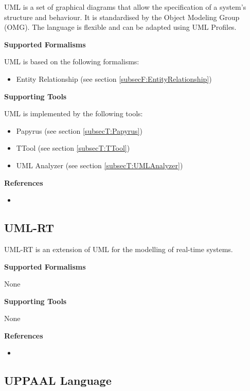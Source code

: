 UML is a set of graphical diagrams that allow the specification of a system's structure and behaviour. It is standardised by the Object Modeling Group (OMG). The language is flexible and can be adapted using UML Profiles.

\textbf{Supported Formalisms}

UML is based on the following formalisms:
\begin{itemize}
	\item Entity Relationship (see section \ref{subsecF:EntityRelationship})
\end{itemize}


\textbf{Supporting Tools}

UML is implemented by the following tools:
\begin{itemize}
	\item Papyrus (see section \ref{subsecT:Papyrus})
	\item TTool (see section \ref{subsecT:TTool})
	\item UML Analyzer (see section \ref{subsecT:UMLAnalyzer})
\end{itemize}


\textbf{References}
\begin{itemize}
	
\item {}
\end{itemize}



\subsection{UML-RT}
\label{subsecL:UML-RT}


UML-RT is an extension of UML for the modelling of real-time systems.

\textbf{Supported Formalisms}

None


\textbf{Supporting Tools}

None


\textbf{References}
\begin{itemize}
	
\item {}
\end{itemize}



\subsection{UPPAAL Language}
\label{subsecL:UPPAALRequirementSpecificationLanguage}



